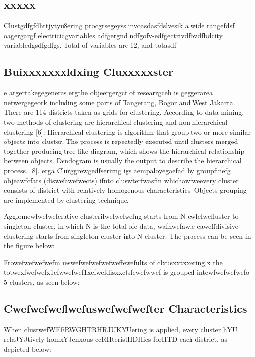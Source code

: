 \documentclass[conference]{IEEEtran}
\begin{document}
{\subsection{xxxxx}
Clustgdfgfdhttjytyu8ering procgrsegeyss invoasdasfdslvesik a wide rangefdsf oagergargf electricidgvariables adfgergnd ndfgofv-edfgectrivdfbvdfbdcity variabledgsdfgdfgs. Total of variables are 12, and totasdf
    

\subsection{Buixxxxxxxldxing Cluxxxxxster }

e argertakegegeneras ergthe objeergergct of researrgceh is geggerarea netwergegeork including some parts of Tangerang, Bogor and West Jakarta. There are 114 districts taken as grids for clustering. According to data mining, two methods of clustering are hierarchical clustering and non-hierarchical clustering [6]. Hierarchical clustering is algorithm that group two or more similar objects into cluster.  The process is repeatedly executed until clusters merged together producing tree-like diagram, which shows the hierarchical relationship between objects. Dendogram is usually the output to describe the hierarchical process. [8].
erga
Clurggrewgedfserirng igs aempaloyegaefad by groupfinefg objeawfcfats (diswefawefwects) ifnto cluswterfwasfin whichawfweevery cluster consists of district with relatively homogenous characteristics. Objects grouping are implemented by clustering technique. 

Agglomewfwefweferative clusterifwefwefwefng starts from N cwfefwefluster to singleton cluster, in which N is the total ofe data, wafhwefawle eaweffdivisive clustering starts from singleton cluster into N cluster. The process can be seen in the figure below: 
    
Frowefwefwefwefm reswefwefwefwefweffewefults of clxusxxtxxering,x the totwexfwefwefx1efwwefwef1xefwefdisxxctsfewefwwef is grouped intewfwefwefwefo 5 clusters, as seen below:
    
\subsection{Cwefwefweflwefuswefwefwefter Characteristics}
When clustwefWEFRWGHTRHRJUKYUering is applied, every cluster hYU relaJYJtively homxYJenxous ccRHteristHDHics forHTD each district, as depicted below:
    
}
\end{document}
